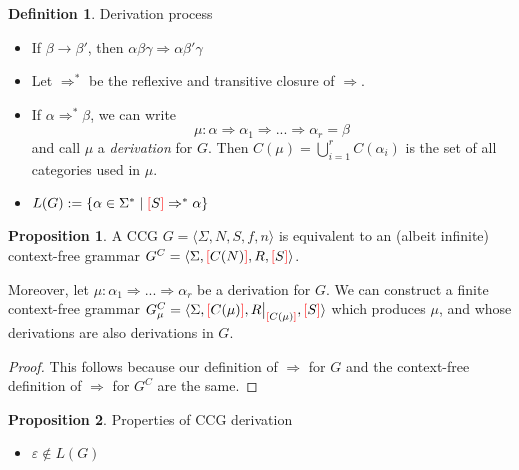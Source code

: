 \documentclass[12pt]{extarticle}
\newcommand\restr[2]{{%
  \left.\kern-\nulldelimiterspace %
  #1 %
  \vphantom{\big|} %
  \right|_{#2} %
  }}
\theoremstyle{definition} \newtheorem{defn}{Definition}
\theoremstyle{definition} \newtheorem{prop}{Proposition}
\theoremstyle{definition} \newtheorem{property}{Property}
\newcommand{\lb}{\textcolor{red}{[}}
\newcommand{\rb}{\textcolor{red}{]}}
\begin{document}
\begin{defn}
    Derivation process
    \begin{itemize}
        \item If $\beta \rightarrow \beta'$, then $\alpha \beta \gamma \Rightarrow \alpha \beta' \gamma$
        \item Let $\Rightarrow^*$ be the reflexive and transitive closure of $\Rightarrow$.
        \item If $\alpha \Rightarrow^* \beta$, we can write
            \[ \mu: \alpha \Rightarrow \alpha_1 \Rightarrow ... \Rightarrow \alpha_r = \beta \]
            and call $\mu$ a \emph{derivation} for $G$. Then $C(\mu) = \bigcup\limits_{i=1}^{r} C(\alpha_i)$
            is the set of all categories used in $\mu$.
        \item $L(G) := \{ \alpha \in \Sigma^* \mid \lb S \rb \Rightarrow^* \alpha \}$
    \end{itemize}
\end{defn}

\begin{prop}\label{prop:cfg}
    A CCG $G = \langle \Sigma, N, S, f, n \rangle$ is equivalent to an
    (albeit infinite) context-free grammar
    $G^C = \langle \Sigma, \lb C(N) \rb, R, \lb S \rb \rangle$.

    Moreover, let $\mu: \alpha_1 \Rightarrow ... \Rightarrow \alpha_r$
    be a derivation for $G$.
    We can construct a finite context-free grammar
    $G_\mu^C = \langle \Sigma, \lb C(\mu) \rb, \restr{R}{\lb C(\mu) \rb}, \lb S \rb \rangle$
    which produces $\mu$, and whose derivations are also derivations in $G$.
\end{prop}
\begin{proof}
    This follows because our definition of $\Rightarrow$ for $G$ and the context-free
    definition of $\Rightarrow$ for $G^C$ are the same.
\end{proof}

\begin{prop}
    Properties of CCG derivation
    \begin{itemize}
        \item $\varepsilon \notin L(G)$
    \end{itemize}
\end{prop}
\end{document}
